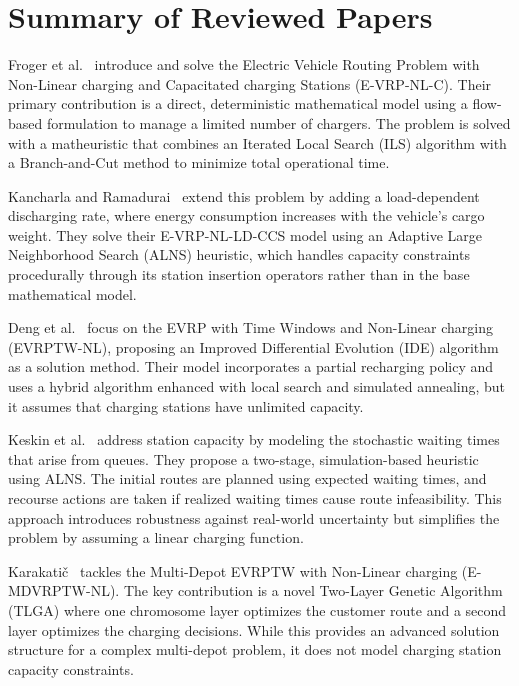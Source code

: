 \section{Summary of Reviewed Papers}
Froger et al.~\cite{Froger2022} introduce and solve the Electric Vehicle Routing Problem with Non-Linear charging and Capacitated charging Stations (E-VRP-NL-C). Their primary contribution is a direct, deterministic mathematical model using a flow-based formulation to manage a limited number of chargers. The problem is solved with a matheuristic that combines an Iterated Local Search (ILS) algorithm with a Branch-and-Cut method to minimize total operational time.

Kancharla and Ramadurai~\cite{Kancharla2020} extend this problem by adding a load-dependent discharging rate, where energy consumption increases with the vehicle's cargo weight. They solve their E-VRP-NL-LD-CCS model using an Adaptive Large Neighborhood Search (ALNS) heuristic, which handles capacity constraints procedurally through its station insertion operators rather than in the base mathematical model.

Deng et al.~\cite{Deng2024} focus on the EVRP with Time Windows and Non-Linear charging (EVRPTW-NL), proposing an Improved Differential Evolution (IDE) algorithm as a solution method. Their model incorporates a partial recharging policy and uses a hybrid algorithm enhanced with local search and simulated annealing, but it assumes that charging stations have unlimited capacity.

Keskin et al.~\cite{Keskin2021} address station capacity by modeling the stochastic waiting times that arise from queues. They propose a two-stage, simulation-based heuristic using ALNS. The initial routes are planned using expected waiting times, and recourse actions are taken if realized waiting times cause route infeasibility. This approach introduces robustness against real-world uncertainty but simplifies the problem by assuming a linear charging function.

Karakatič~\cite{Karakatic2021} tackles the Multi-Depot EVRPTW with Non-Linear charging (E-MDVRPTW-NL). The key contribution is a novel Two-Layer Genetic Algorithm (TLGA) where one chromosome layer optimizes the customer route and a second layer optimizes the charging decisions. While this provides an advanced solution structure for a complex multi-depot problem, it does not model charging station capacity constraints.


